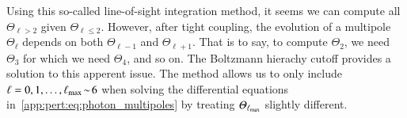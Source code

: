     Using this so-called line-of-sight integration method, it seems we can compute all $\Theta_{\ell>2}$ given $\Theta_{\ell\leq 2}$. However, after tight coupling, the evolution of a multipole $\Theta_\ell$ depends on both $\Theta_{\ell-1}$ and $\Theta_{\ell+1}$. That is to say, to compute $\Theta_2$, we need $\Theta_3$ for which we need $\Theta_4$, and so on. The Boltzmann hierachy cutoff provides a solution to this apperent issue. The method allows us to only include $\ell=0, 1, \dots, \ell_\mathrm{max}\!\sim\! 6$ when solving the differential equations in~\cref{app:pert:eq:photon_multipoles} by treating $\varTheta_{\ell_\mathrm{max}}$ slightly different. 
    

